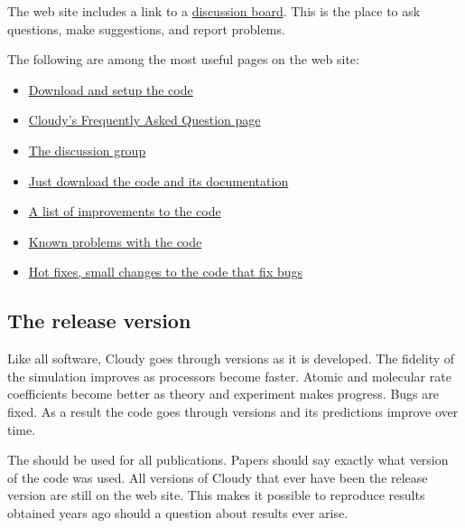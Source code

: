 \documentclass[12pt,twoside]{article}
\begin{document}
{The web site includes a link to a 
\href{https:cloudyastrophysics.groups.io}{discussion board}.  This is the place
to ask questions, make suggestions, and report problems.

The following are among the most useful pages on the web site:
%
\begin{itemize}

\item 
\href{https://gitlab.nublado.org/cloudy/cloudy/-/wikis/StepByStep}
     {Download and setup the code}

\item
\href{https://gitlab.nublado.org/cloudy/cloudy/-/wikis/Frequently-asked-Questions-about-Cloudy}
     {Cloudy's Frequently Asked Question page}

\item
\href{https://cloudyastrophysics.groups.io}{The discussion group}

\item
\href{https://gitlab.nublado.org/cloudy/cloudy/-/wikis/DownloadLinks}
     {Just download the code and its documentation}

\item
\href{https://gitlab.nublado.org/cloudy/cloudy/-/wikis/RevisionHistory}
     {A list of improvements to the code}

\item
\href{https://gitlab.nublado.org/cloudy/cloudy/-/wikis/KnownProblems}
     {Known problems with the code}

\item
\href{https://gitlab.nublado.org/cloudy/cloudy/-/wikis/HotFixes}
     {Hot fixes, small changes to the code that fix bugs}
\end{itemize}

\subsection{The release version}

Like all software, Cloudy goes through versions as it is developed.
The fidelity of the simulation improves as processors become faster.  Atomic
and molecular rate coefficients become better as theory and experiment makes
progress.  Bugs are fixed.
As a result the code goes through versions and its predictions improve over time.

The  should
be used for all publications.  Papers
should say exactly what version of the code was used.
All versions of Cloudy
that ever have been the release version are still on the web site.
This makes it possible to reproduce results obtained years ago should a
question about results ever arise.

}
\end{document}
